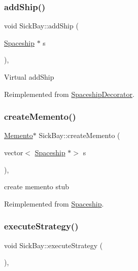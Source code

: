 \subsubsection{\texorpdfstring{add\+Ship()}{addShip()}}
{\footnotesize\ttfamily void Sick\+Bay\+::add\+Ship (\begin{DoxyParamCaption}\item[{\hyperlink{classSpaceship}{Spaceship} $\ast$}]{s }\end{DoxyParamCaption})\hspace{0.3cm}{\ttfamily [inline]}, {\ttfamily [virtual]}}

Virtual add\+Ship 

Reimplemented from \hyperlink{classSpaceshipDecorator_a5ed39419f5fab65dd4af11bf5136f7a4}{Spaceship\+Decorator}.

\mbox{\label{classSickBay_a0d06ca126941dae25aaf74838dd1914b}} 
\subsubsection{\texorpdfstring{create\+Memento()}{createMemento()}}
{\footnotesize\ttfamily \hyperlink{classMemento}{Memento}$\ast$ Sick\+Bay\+::create\+Memento (\begin{DoxyParamCaption}\item[{vector$<$ \hyperlink{classSpaceship}{Spaceship} $\ast$$>$}]{s }\end{DoxyParamCaption})\hspace{0.3cm}{\ttfamily [inline]}, {\ttfamily [virtual]}}

create memento stub 

Reimplemented from \hyperlink{classSpaceship_a6d272f846b019dec8226ddab65648a7b}{Spaceship}.

\mbox{\label{classSickBay_af053a3507f8246fd1577124644cf7477}} 
\subsubsection{\texorpdfstring{execute\+Strategy()}{executeStrategy()}}
{\footnotesize\ttfamily void Sick\+Bay\+::execute\+Strategy (\begin{DoxyParamCaption}{ }\end{DoxyParamCaption})\hspace{0.3cm}{\ttfamily [inline]}, {\ttfamily [virtual]}}

